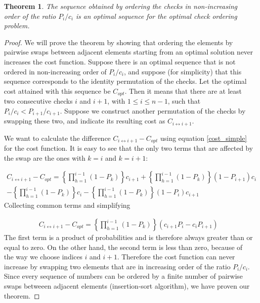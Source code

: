 \documentclass[10pt,a4paper]{article}
\newtheorem{mythm}{Theorem}
\begin{document}
\begin{mythm}
The sequence obtained by ordering the checks in non-increasing order of the ratio $P_{i}/c_{i}$  is an optimal sequence for the optimal check ordering problem.
\end{mythm}
\begin{proof}
We will prove the theorem by showing that ordering the elements by pairwise swaps between adjacent elements starting from an optimal solution never increases the cost function. Suppose there is an optimal sequence that is not ordered in non-increasing order of $P_{i}/c_{i}$, and suppose (for simplicity) that this sequence corresponds to the identity permutation of the checks. Let the optimal cost attained with this sequence be $C_{opt}$. Then it means that there are at least two consecutive checks $i$ and $i+1$, with $1 \leq i \leq n-1$, such that $P_{i}/c_{i} < P_{i+1}/c_{i+1}$. Suppose we construct another permutation of the checks by swapping these two, and indicate its resulting cost as $C_{i \leftrightarrow i+1}$.

We want to calculate the difference $C_{i \leftrightarrow i+1} - C_{opt}$ using equation \eqref{cost_simple} for the cost function. It is easy to see that the only two terms that are affected by the swap are the ones with $k=i$ and $k=i+1$:

\begin{equation}
\begin{split}
	C_{i \leftrightarrow i+1} - C_{opt} = \left\{\prod_{h=1}^{i-1}(1-P_{k})\right\}c_{i+1} + \left\{\prod_{h=1}^{i-1}(1-P_{k})\right\}(1-P_{i+1})c_{i} \\
	-\left\{\prod_{h=1}^{i-1}(1-P_{k})\right\}c_{i} - \left\{\prod_{h=1}^{i-1}(1-P_{k})\right\}(1-P_{i})c_{i+1}
\end{split}
\end{equation}
Collecting common terms and simplifying

\begin{equation}
\begin{split}
	C_{i \leftrightarrow i+1} - C_{opt} = \left\{\prod_{h=1}^{i-1}(1-P_{k})\right\}\left( c_{i+1}P_{i} - c_{i}P_{i+1} \right) 
\end{split}
\end{equation}
The first term is a product of probabilities and is therefore always greater than or equal to zero. On the other hand, the second term is less than zero, because of the way we choose indices $i$ and $i+1$. Therefore the cost function can never increase by swapping two elements that are in increasing order of the ratio $P_{i}/c_{i}$. Since every sequence of numbers can be ordered by a finite number of pairwise swaps betweeen adjacent elements (insertion-sort algorithm), we have proven our theorem.

\end{proof}
\end{document}
